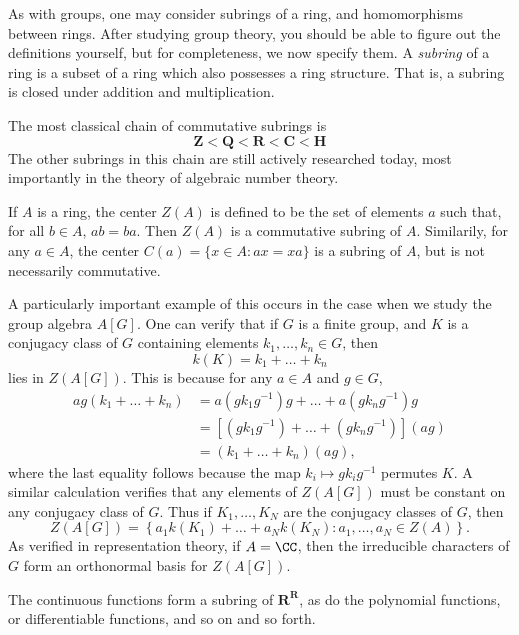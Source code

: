 %
As with groups, one may consider subrings of a ring, and homomorphisms between rings. After studying group theory, you should be able to figure out the definitions yourself, but for completeness, we now specify them. A \emph{subring} of a ring is a subset of a ring which also possesses a ring structure. That is, a subring is closed under addition and multiplication.

\begin{example}
    The most classical chain of commutative subrings is
    \[ \mathbf{Z} < \mathbf{Q} < \mathbf{R} < \mathbf{C} < \mathbf{H} \]
    The other subrings in this chain are still actively researched today, most importantly in the theory of algebraic number theory.
\end{example}

\begin{example}
    If $A$ is a ring, the center $Z(A)$ is defined to be the set of elements $a$ such that, for all $b \in A$, $ab = ba$. Then $Z(A)$ is a commutative subring of $A$. Similarily, for any $a \in A$, the center $C(a) = \{ x \in A: ax = xa \}$ is a subring of $A$, but is not necessarily commutative.

    A particularly important example of this occurs in the case when we study the group algebra $A[G]$. One can verify that if $G$ is a finite group, and $K$ is a conjugacy class of $G$ containing elements $k_1, \dots, k_n \in G$, then
    \[ k(K) = k_1 + \dots + k_n \]
    lies in $Z(A[G])$. This is because for any $a \in A$ and $g \in G$,
    \begin{align*}
        ag(k_1 + \dots + k_n) &= a(gk_1g^{-1}) g + \dots + a(gk_ng^{-1}) g\\
        &= [(gk_1g^{-1}) + \dots + (gk_ng^{-1})] (ag)\\
        &= (k_1 + \dots + k_n) (ag),
    \end{align*}
    where the last equality follows because the map $k_i \mapsto gk_ig^{-1}$ permutes $K$. A similar calculation verifies that any elements of $Z(A[G])$ must be constant on any conjugacy class of $G$. Thus if $K_1, \dots, K_N$ are the conjugacy classes of $G$, then
    \[ Z(A[G]) = \left\{ a_1 k(K_1) + \dots + a_N k(K_N) : a_1, \dots, a_N \in Z(A) \right\}. \]
    As verified in representation theory, if $A = \CC$, then the irreducible characters of $G$ form an orthonormal basis for $Z(A[G])$. 
\end{example}

\begin{example}
    The continuous functions form a subring of $\mathbf{R}^\mathbf{R}$, as do the polynomial functions, or differentiable functions, and so on and so forth.
\end{example}

